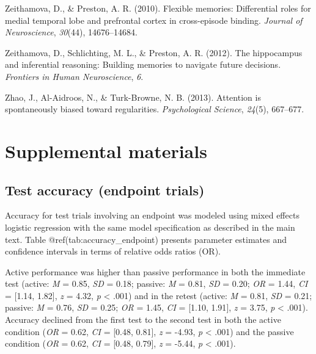 \documentclass[floatsintext,man]{apa6}
\theoremstyle{definition}
\theoremstyle{definition}
\theoremstyle{definition}
\theoremstyle{remark}
\begin{document}
\hypertarget{ref-zeithamova2010flexible}{}
Zeithamova, D., \& Preston, A. R. (2010). Flexible memories:
Differential roles for medial temporal lobe and prefrontal cortex in
cross-episode binding. \emph{Journal of Neuroscience}, \emph{30}(44),
14676--14684.

\hypertarget{ref-zeithamova2012hippocampus}{}
Zeithamova, D., Schlichting, M. L., \& Preston, A. R. (2012). The
hippocampus and inferential reasoning: Building memories to navigate
future decisions. \emph{Frontiers in Human Neuroscience}, \emph{6}.

\hypertarget{ref-zhao2013attention}{}
Zhao, J., Al-Aidroos, N., \& Turk-Browne, N. B. (2013). Attention is
spontaneously biased toward regularities. \emph{Psychological Science},
\emph{24}(5), 667--677.

\endgroup

\newpage

\section{Supplemental materials}\label{supplemental-materials}

\subsection{Test accuracy (endpoint
trials)}\label{test-accuracy-endpoint-trials}

Accuracy for test trials involving an endpoint was modeled using mixed
effects logistic regression with the same model specification as
described in the main text. Table @ref(tab:accuracy\_endpoint) presents
parameter estimates and confidence intervals in terms of relative odds
ratios (OR).

Active performance was higher than passive performance in both the
immediate test (active: \emph{M} = 0.85, \emph{SD} = 0.18; passive:
\emph{M} = 0.81, \emph{SD} = 0.20; \emph{OR} = 1.44, \emph{CI} =
{[}1.14, 1.82{]}, \emph{z} = 4.32, \emph{p} \textless{} .001) and in the
retest (active: \emph{M} = 0.81, \emph{SD} = 0.21; passive: \emph{M} =
0.76, \emph{SD} = 0.25; \emph{OR} = 1.45, \emph{CI} = {[}1.10, 1.91{]},
\emph{z} = 3.75, \emph{p} \textless{} .001). Accuracy declined from the
first test to the second test in both the active condition (\emph{OR} =
0.62, \emph{CI} = {[}0.48, 0.81{]}, \emph{z} = -4.93, \emph{p}
\textless{} .001) and the passive condition (\emph{OR} = 0.62, \emph{CI}
= {[}0.48, 0.79{]}, \emph{z} = -5.44, \emph{p} \textless{} .001).
\end{document}
